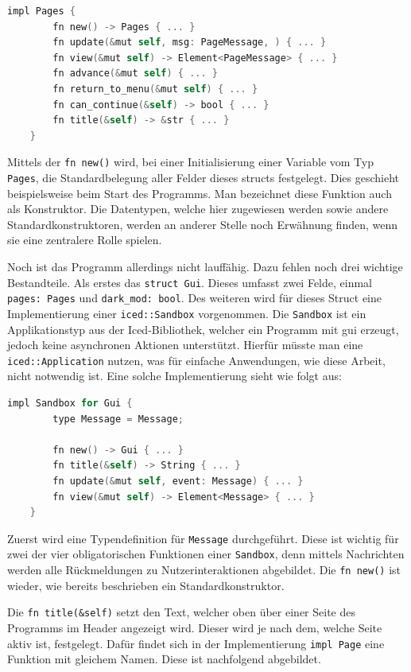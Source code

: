 \begin{lstlisting}[language=C]
    impl Pages {
        fn new() -> Pages { ... }
        fn update(&mut self, msg: PageMessage, ) { ... }
        fn view(&mut self) -> Element<PageMessage> { ... }
        fn advance(&mut self) { ... }
        fn return_to_menu(&mut self) { ... }
        fn can_continue(&self) -> bool { ... }
        fn title(&self) -> &str { ... }
    }
\end{lstlisting}

Mittels der \lstinline{fn new()} wird, bei einer Initialisierung einer Variable vom Typ \lstinline{Pages}, die Standardbelegung aller Felder dieses structs festgelegt. 
Dies geschieht beispielsweise beim Start des Programms. Man bezeichnet diese Funktion auch als Konstruktor. Die Datentypen, welche hier zugewiesen werden sowie andere Standardkonstruktoren,
werden an anderer Stelle noch Erwähnung finden, wenn sie eine zentralere Rolle spielen.

Noch ist das Programm allerdings nicht lauffähig. Dazu fehlen noch drei wichtige Bestandteile. Als erstes das \lstinline{struct Gui}. Dieses umfasst zwei Felde, einmal 
\lstinline{pages: Pages} und \lstinline{dark_mod: bool}. Des weiteren wird für dieses Struct eine Implementierung einer \lstinline{iced::Sandbox} vorgenommen.
Die \lstinline{Sandbox} ist ein Applikationstyp aus der Iced-Bibliothek, welcher ein Programm mit \ac{gui} erzeugt, jedoch keine asynchronen Aktionen unterstützt. Hierfür müsste man
eine \lstinline{iced::Application} nutzen, was für einfache Anwendungen, wie diese Arbeit, nicht notwendig ist. Eine solche Implementierung sieht wie folgt aus:

\begin{lstlisting}[language=C]
    impl Sandbox for Gui {
        type Message = Message;

        fn new() -> Gui { ... }
        fn title(&self) -> String { ... }
        fn update(&mut self, event: Message) { ... }
        fn view(&mut self) -> Element<Message> { ... }
    }
\end{lstlisting}

Zuerst wird eine Typendefinition für \lstinline{Message} durchgeführt. Diese ist wichtig für zwei der vier obligatorischen Funktionen einer \lstinline{Sandbox}, denn 
mittels Nachrichten werden alle Rückmeldungen zu Nutzerinteraktionen abgebildet. Die \lstinline{fn new()} ist wieder, wie bereits beschrieben ein Standardkonstruktor.

Die \lstinline{fn title(&self)} setzt den Text, welcher oben über einer Seite des Programms im Header angezeigt wird. Dieser wird je nach dem, welche Seite aktiv ist,
festgelegt. Dafür findet sich in der Implementierung \lstinline{impl Page} eine Funktion mit gleichem Namen. Diese ist nachfolgend abgebildet.

